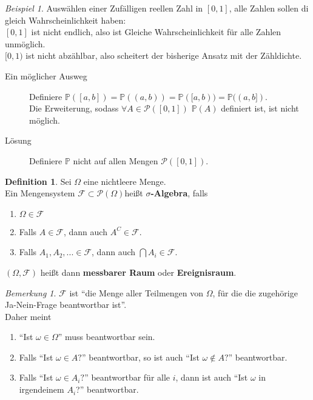 \documentclass[10pt,a4paper]{article}
\newcommand{\potset}{\mathscr P}
\newcommand{\Prb}{\mathbb P}
\theoremstyle{plain}
\theoremstyle{definition}
\newtheorem{definition}[theorem]{Definition}
\theoremstyle{remark}
\newtheorem{bem}[theorem]{Bemerkung}
\newtheorem{exm}[theorem]{Beispiel}
\begin{document}
	\begin{exm}
		Auswählen einer Zufälligen reellen Zahl in $[0,1]$, alle Zahlen sollen di gleich Wahrscheinlichkeit haben:\\
		$[0,1]$ ist nicht endlich, also ist Gleiche Wahrscheinlichkeit für alle Zahlen unmöglich.\\
		$[0,1)$ ist nicht abzählbar, also scheitert der bisherige Ansatz mit der Zähldichte.\\
		\begin{description}
			\item[Ein möglicher Ausweg]
			Definiere $\Prb([a,b])=\Prb((a,b))=\Prb([a,b))=\Prb((a,b])$.\\
			Die Erweiterung, sodass $\forall A\in\potset([0,1])$ $\Prb(A)$ definiert ist, ist nicht möglich.
			\item[Lösung] Definiere $\Prb$ nicht auf allen Mengen $\potset([0,1])$.
		\end{description}
	\end{exm}
	\begin{definition}
		Sei $\Omega$ eine nichtleere Menge.\\
		Ein Mengensystem $\mathscr F\subset \potset(\Omega)$heißt \textbf{$\sigma$-Algebra}, falls
		\begin{enumerate}
			\item $\Omega\in\mathscr F$
			\item Falls $A\in\mathscr F$, dann auch $A^C\in\mathscr F$.
			\item Falls $A_1,A_2,...\in\mathscr F$, dann auch $\bigcap A_i\in\mathscr F$.
		\end{enumerate}
	$(\Omega,\mathscr F)$ heißt dann \textbf{messbarer Raum} oder \textbf{Ereignisraum}.
	\end{definition}

	\begin{bem}
		$\mathscr F$ ist ``die Menge aller Teilmengen von $\Omega$, für die die zugehörige Ja-Nein-Frage beantwortbar ist''.\\
		Daher meint
		\begin{enumerate}
			\item ``Ist $\omega\in\Omega$'' muss beantwortbar sein.
			\item Falls ``Ist $\omega\in A?$'' beantwortbar, so ist auch ``Ist $\omega\notin A?$'' beantwortbar.
			\item Falls ``Ist $\omega\in A_i?$'' beantwortbar für alle $i$, dann ist auch ``Ist $\omega$ in irgendeinem $A_i$?'' beantwortbar.
		\end{enumerate}
	\end{bem}
\end{document}
